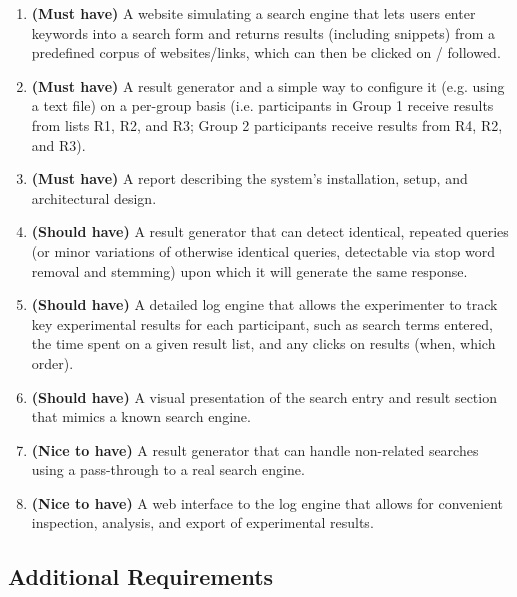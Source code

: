 \documentclass[a4paper]{usiinfbachelorproject}
\begin{document}
    \begin{enumerate}

        \item \textbf{(Must have)} A website simulating a search engine that lets users enter keywords into a search form and
              returns results (including snippets) from a predefined corpus of websites/links, which can then be clicked on / followed.

        \item \textbf{(Must have)} A result generator and a simple way to configure it (e.g. using a text file) on a per-group
              basis (i.e. participants in Group 1 receive results from lists R1, R2, and R3; Group 2 participants
              receive results from R4, R2, and R3).

        \item \textbf{(Must have)} A report describing the system's installation, setup, and architectural design. 

        \item \textbf{(Should have)} A result generator that can detect identical, repeated queries (or minor variations of
              otherwise identical queries, detectable via stop word removal and stemming) upon which it will generate the same response.

        \item \textbf{(Should have)} A detailed log engine that allows the experimenter to track key experimental results
              for each participant, such as search terms entered, the time spent on a given result list, and any clicks on
              results (when, which order).

        \item \textbf{(Should have)} A visual presentation of the search entry and result section that mimics a known search engine.  

        \item \textbf{(Nice to have)} A result generator that can handle non-related searches using a pass-through to a real search engine.

        \item \textbf{(Nice to have)} A web interface to the log engine that allows for convenient inspection, analysis,
              and export of experimental results.

    \end{enumerate}

\subsection{Additional Requirements} \label{sec:reqAdditional}
\end{document}
